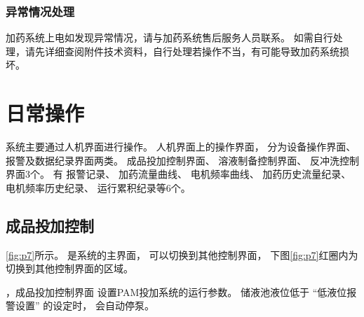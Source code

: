       \subsubsection{异常情况处理}
      加药系统上电如发现异常情况，请与加药系统售后服务人员联系。
      如需自行处理，请先详细查阅附件技术资料，自行处理若操作不当，有可能导致加药系统损坏。

\newpage %

\section{日常操作}\label{sec:sg3}
   系统主要通过人机界面进行操作。
      人机界面上的操作界面，
      分为设备操作界面、报警及数据纪录界面两类。
      成品投加控制界面、
      溶液制备控制界面、
      反冲洗控制界面3个。
       有
      报警记录、
      加药流量曲线、
      电机频率曲线、
      加药历史流量纪录、
      电机频率历史纪录、
      运行累积纪录等6个。

   \subsection{成品投加控制}

      \ref{fig:p7}所示。
      是系统的主界面，
      可以切换到其他控制界面，
      下图\ref{fig:p7}红圈内为切换到其他控制界面的区域。

        

      ，成品投加控制界面
      设置PAM投加系统的运行参数。
            储液池液位低于
            “低液位报警设置”
            的设定时，
            会自动停泵。


